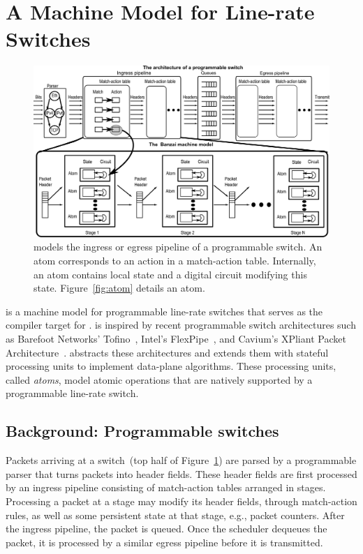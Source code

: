 \section{A Machine Model for Line-rate Switches}
\label{s:absmachine}
\begin{figure}[!t]
  \includegraphics[width=\textwidth]{domino_banzai.pdf}
  \caption{\absmachine models the ingress or egress pipeline of a
  programmable switch. An atom corresponds to an action in a match-action
  table. Internally, an atom contains local state and a digital circuit 
  modifying this state. Figure~\ref{fig:atom} details an atom.}
  \label{fig:switch}
\end{figure}

\absmachine is a machine model for programmable line-rate switches that serves
as the compiler target for \pktlanguage.  \absmachine is inspired by recent
programmable switch architectures such as Barefoot Networks' Tofino~\cite{tofino},
Intel's FlexPipe~\cite{flexpipe}, and Cavium's XPliant Packet
Architecture~\cite{xpliant}. \absmachine abstracts these architectures and
extends them with stateful processing units to implement data-plane algorithms.
These processing units, called {\em atoms}, model atomic operations
that are natively supported by a programmable line-rate switch.

\subsection{Background: Programmable switches}
Packets arriving at a switch~(top half of Figure~\ref{fig:switch}) are parsed
by a programmable parser that turns packets into header fields. These header
fields are first processed by an ingress pipeline consisting of match-action
tables arranged in stages. Processing a packet at a stage may modify its header
fields, through match-action rules, as well as some persistent state at that
stage, e.g., packet counters. After the ingress pipeline, the packet is
queued. Once the scheduler dequeues the packet, it is processed by a
similar egress pipeline before it is transmitted.

